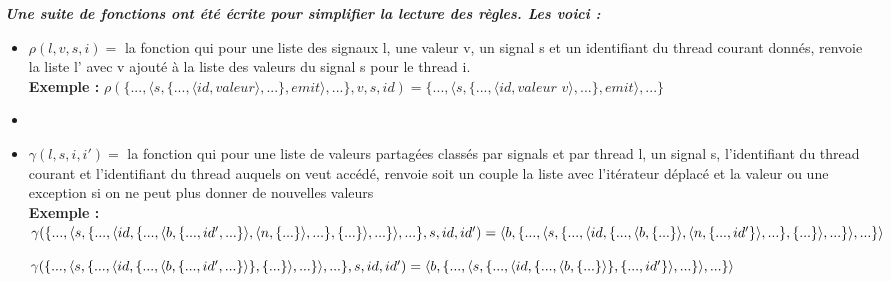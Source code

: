 \documentclass[10pt,a4paper]{article}
\begin{document}
				
				\textbf{\textit{Une suite de fonctions ont été écrite pour simplifier la lecture des règles. Les voici :}}
				\smallbreak
				\begin{itemize}
					\item[] $\rho(l,v,s,i) =$ la fonction qui pour une liste des signaux l, une valeur v, un signal s et un identifiant du thread courant donnés, renvoie la liste l' avec v ajouté à la liste des valeurs du signal s pour le thread i.
					\\\textbf{Exemple :} $\rho(\{...,\langle s,\{...,\langle id,valeur\rangle,...\},emit\rangle,...\},v,s,id) = \{...,\langle s,\{...,\langle id,valeur$ $v\rangle,...\},emit\rangle,...\}$
					\item[] 
					\item[] $\gamma(l,s,i,i') =$ la fonction qui pour une liste de valeurs partagées classés par signals et par thread l, un signal s, l'identifiant du thread courant et l'identifiant du thread auquels on veut accédé, renvoie soit un couple la liste avec l'itérateur déplacé et la valeur ou une exception si on ne peut plus donner de nouvelles valeurs 
					\\\textbf{Exemple :}
					\\$\gamma(\{...,\langle s,\{...,\langle id,\{...,\langle b,\{...,id',...\}\rangle,\langle n,\{...\}\rangle,...\},\{...\}\rangle,...\}\rangle,...\},s,id,id') = 
					\\\langle b , \{...,\langle s,\{...,\langle id,\{...,\langle b,\{...\}\rangle,\langle n,\{...,id'\}\rangle,...\},\{...\}\rangle,...\}\rangle,...\} \rangle$
					\medbreak
						
					$\gamma(\{...,\langle s,\{...,\langle id,\{...,\langle b,\{...,id',...\}\rangle\},\{...\}\rangle,...\}\rangle,...\},s,id,id') = 
					\\\langle b , \{...,\langle s,\{...,\langle id,\{...,\langle b,\{...\}\rangle\},\{...,id'\}\rangle,...\}\rangle,...\} \rangle$
					\medbreak
						

\end{itemize}
\end{document}
